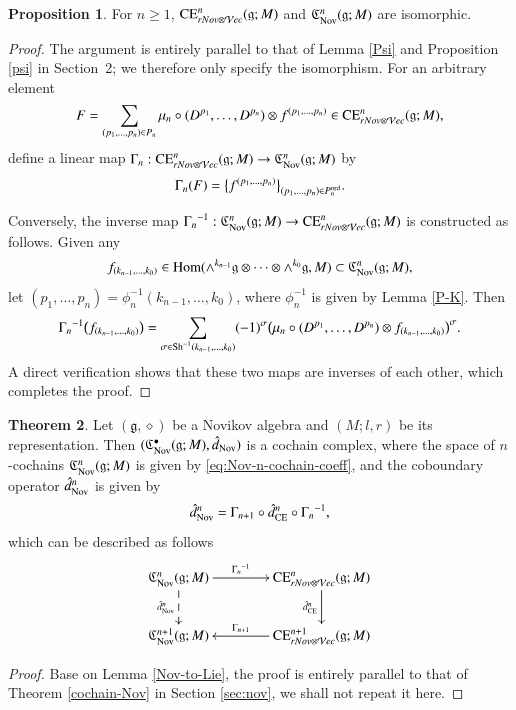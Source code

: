 \documentclass[12pt]{amsart}
\theoremstyle{definition}
\newtheorem{thm}{Theorem}[section]
\newtheorem{pro}[thm]{Proposition}
\newcommand{\g}{\mathfrak g}
\newcommand{\frkC}{\mathfrak C}
\newcommand{\Hom}{\mathrm{Hom}}
\newcommand{\ot}{\otimes}
\newcommand{\Sh}{{\rm Sh}}
\newcommand{\ce}{{\rm CE}}
\newcommand{\ord}{{\rm ord}}
\newcommand{\nov}{{\rm Nov}}
\begin{document}
\begin{pro}\label{Lie-Nov-1-1}
	For $n\geq 1$, $\ce_{rNov\ot \mathcal{V}ec}^n(\g;M)$ and $\frkC_{\nov}^n(\mathfrak{g};M)$ are isomorphic.
\end{pro}
\begin{proof}
	The argument is entirely parallel to that of Lemma \ref{Psi} and Proposition \ref{psi} in Section~2; we therefore only specify the isomorphism. 	
 For an arbitrary element
	\[
	F=\sum_{(p_1,\dots,p_n)\in P_n}\mu_n\circ(D^{p_1},\dots,D^{p_n})\otimes f^{(p_1,\dots,p_n)}\in \ce_{rNov\ot \mathcal{V}ec}^n(\g;M),
	\]
define a linear map $\Gamma_n:\ce_{rNov\ot \mathcal{V}ec}^n(\g;M)\to \frkC_{\nov}^n(\mathfrak{g};M)$ by
\begin{align}
	\Gamma_n(F)=\bigl\{f^{(p_1,\dots,p_n)}\bigr\}_{(p_1,\dots,p_n)\in P_n^{\ord}}.
\end{align}

Conversely, the inverse map ${\Gamma_n}^{-1}:\frkC_{\nov}^n(\mathfrak{g};M)\to \ce_{rNov\ot \mathcal{V}ec}^n(\g;M)$ is constructed as follows.  Given any
$$
f_{(k_{n-1},\dots,k_0)}\in\Hom(\wedge^{k_{n-1}}\g\ot\cdots\ot\wedge^{k_0}\g,M)\subset \frkC_{\nov}^n(\mathfrak{g};M),
$$
let $(p_1,\dots,p_n)=\phi_n^{-1}(k_{n-1},\dots,k_0)$, where $\phi_n^{-1}$ is given by Lemma \ref{P-K}.  Then
	\[
{\Gamma_n}^{-1}\bigl(f_{(k_{n-1},\dots,k_0)}\bigr)
	= \sum_{\sigma\in\Sh^{-1}(k_{n-1},\dots,k_0)} (-1)^\sigma \bigl(\mu_n\circ(D^{p_1},\dots,D^{p_n})\otimes f_{(k_{n-1},\dots,k_0)}\bigr)^\sigma .
	\]
	A direct verification shows that these two maps are inverses of each other, which completes the proof.
\end{proof}


\begin{thm}\label{cochain-Nov-coeff}
Let $(\g,\diamond)$ be a Novikov algebra and $(M;l,r)$ be its representation. Then $(\frkC_{\nov}^\bullet(\mathfrak{g};M),\hat{d}_{\nov})$ is a cochain complex,
where the space of $n$-cochains $\frkC_{\nov}^n(\g;M)$ is given by \eqref{eq:Nov-n-cochain-coeff}, and the coboundary operator $\hat{d}_\nov^n$ is given by
$$\hat{d}^n_\nov=\Gamma_{n+1}\circ \hat{d}^n_\ce\circ {\Gamma_n}^{-1},$$
which can be described as follows
$$
	\xymatrix@C=4em{
		\frkC_{\nov}^n(\mathfrak{g};M)
		\ar[r]^-{{\Gamma_{n}}^{-1}}
		\ar@{-->}[d]_{\hat{d}^n_{\nov}}
		&
		\ce^n_{rNov\ot\mathcal{V}ec}(\g;M)
		\ar[d]_{\hat{d}_\ce^n}
		\\
		\frkC_{\nov}^{n+1}(\mathfrak{g};M)
		&
		\ce^{n+1}_{rNov\ot\mathcal{V}ec}(\g;M)
		\ar[l]_-{\Gamma_{n+1}}
	}
$$
\end{thm}
\begin{proof}
Base on Lemma \ref{Nov-to-Lie}, the proof is entirely parallel to that of Theorem \ref{cochain-Nov} in Section \ref{sec:nov}, we shall not repeat it here.
\end{proof}
\end{document}
